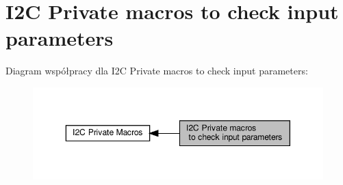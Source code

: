 \hypertarget{group___i2_c___i_s___r_t_c___definitions}{}\section{I2C Private macros to check input parameters}
\label{group___i2_c___i_s___r_t_c___definitions}
Diagram współpracy dla I2C Private macros to check input parameters\+:\nopagebreak
\begin{figure}[H]
\begin{center}
\leavevmode
\includegraphics[width=350pt]{group___i2_c___i_s___r_t_c___definitions}
\end{center}
\end{figure}
